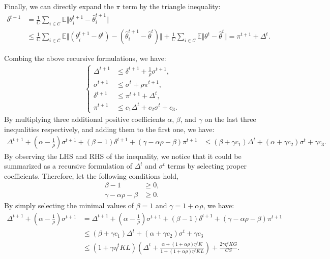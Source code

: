 Finally, we can directly expand the $\pi$ term by the triangle inequality:
\begin{align*}
    \delta^{t+1} 
    &= \frac{1}{C}\sum_{i\in\mathcal{C}}\mathbb{E}\Vert \theta_i^{t+1} -\hat{\theta}_i^{t+1}\Vert \\
    &\leq \frac{1}{C}\sum_{i\in\mathcal{C}}\mathbb{E}\Vert\left(\theta_{i}^{t+1} - \theta^t \right) - \left(\hat{\theta}_{i}^{t+1} - \hat{\theta}^t \right)\Vert + \frac{1}{C}\sum_{i\in\mathcal{C}}\mathbb{E}\Vert \theta^{t} - \hat{\theta}^{t}\Vert = \pi^{t+1} + \Delta^t.
\end{align*}

Combing the above recursive formulations, we have:
\begin{align*}
\begin{cases}
    \Delta^{t+1} &\leq \delta^{t+1} + \frac{1}{\rho}\sigma^{t+1}, \\
    \sigma^{t+1} &\leq \sigma^t + \rho\pi^{t+1}, \\
    \delta^{t+1} &\leq \pi^{t+1} + \Delta^t, \\
    \pi^{t+1} &\leq c_1\Delta^t + c_2\sigma^t + c_3.
\end{cases}
\end{align*}
By multiplying three additional positive coefficients $\alpha$, $\beta$, and $\gamma$ on the last three inequalities respectively, and adding them to the first one, we have:
\begin{align*}
    \Delta^{t+1} + \left(\alpha - \frac{1}{\rho}\right)\sigma^{t+1} + \left(\beta - 1\right)\delta^{t+1} + \left(\gamma - \alpha\rho - \beta\right)\pi^{t+1} &\leq \left(\beta + \gamma c_1\right)\Delta^t + \left(\alpha + \gamma c_2\right)\sigma^t + \gamma c_3.
\end{align*}
By observing the LHS and RHS of the inequality, we notice that it could be summarized as a recursive formulation of $\Delta^t$ and $\sigma^t$ terms by selecting proper coefficients. Therefore, let the following conditions hold,
\begin{align*}
    \beta - 1 &\geq 0,\\
    \gamma - \alpha\rho - \beta &\geq 0.
\end{align*}
By simply selecting the minimal values of $\beta = 1$ and $\gamma=1 + \alpha\rho$, we have:
\begin{align*}
    \Delta^{t+1} + \left(\alpha - \frac{1}{\rho}\right)\sigma^{t+1}
    &= \Delta^{t+1} + \left(\alpha - \frac{1}{\rho}\right)\sigma^{t+1} + \left(\beta - 1\right)\delta^{t+1} + \left(\gamma - \alpha\rho - \beta\right)\pi^{t+1}\\
    &\leq \left(\beta + \gamma c_1\right)\Delta^t + \left(\alpha + \gamma c_2\right)\sigma^t + \gamma c_3\\
    &\leq (1 + \gamma\eta^t KL)\left(\Delta^t + \frac{\alpha + (1 + \alpha\rho)\eta^t K}{1 + (1 + \alpha\rho)\eta^t KL}\right) + \frac{2\gamma\eta^t KG}{CS}.
\end{align*}

